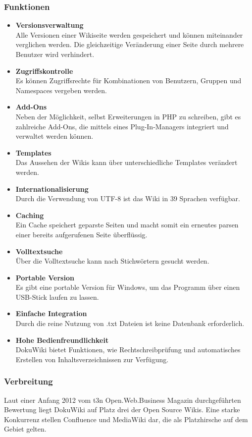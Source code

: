 \subsubsection*{Funktionen}
\begin{itemize}
\item \textbf{Versionsverwaltung}
\\
Alle Versionen einer Wikiseite werden gespeichert und können miteinander verglichen werden. Die gleichzeitige Veränderung einer Seite durch mehrere Benutzer wird verhindert.
\item \textbf{Zugriffskontrolle}
\\
Es können Zugriffsrechte für Kombinationen von Benutzern, Gruppen und Namespaces vergeben werden.
\item \textbf{Add-Ons}
\\
Neben der Möglichkeit, selbst Erweiterungen in PHP zu schreiben, gibt es zahlreiche Add-Ons, die mittels eines Plug-In-Managers integriert und verwaltet werden können.
\item \textbf{Templates}
\\
Das Aussehen der Wikis kann über unterschiedliche Templates verändert werden.
\item \textbf{Internationalisierung}
\\
Durch die Verwendung von UTF-8 ist das Wiki in 39 Sprachen verfügbar.
\item \textbf{Caching}
\\
Ein Cache speichert geparste Seiten und macht somit ein erneutes parsen einer bereits aufgerufenen Seite überflüssig.
\item \textbf{Volltextsuche}
\\
Über die Volltextsuche kann nach Stichwörtern gesucht werden.
\item \textbf{Portable Version}
\\
Es gibt eine portable Version für Windows, um das Programm über einen USB-Stick laufen zu lassen.
\item \textbf{Einfache Integration}
\\
Durch die reine Nutzung von .txt Dateien ist keine Datenbank erforderlich.
\item \textbf{Hohe Bedienfreundlichkeit}
\\
DokuWiki bietet Funktionen, wie Rechtschreibprüfung und automatisches Erstellen von Inhaltsverzeichnissen zur Verfügung.
\end{itemize}

\subsubsection*{Verbreitung}
Laut einer Anfang 2012 vom t3n Open.Web.Business Magazin durchgeführten Bewertung liegt DokuWiki auf Platz drei der Open Source Wikis. Eine starke Konkurrenz stellen Confluence und MediaWiki dar, die als Platzhirsche auf dem Gebiet gelten.
